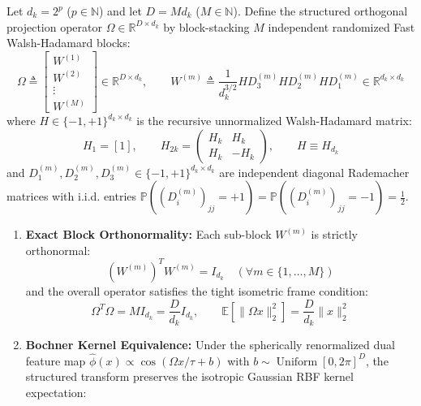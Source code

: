 
\begin{theorem}
\label{thm:fwht}
Let $d_k = 2^p$ ($p \in \mathbb{N}$) and let $D = M d_k$ ($M \in \mathbb{N}$). Define the structured orthogonal projection operator $\Omega \in \mathbb{R}^{D \times d_k}$ by block-stacking $M$ independent randomized Fast Walsh-Hadamard blocks:
\begin{equation}
\Omega \triangleq \begin{bmatrix} W^{(1)} \\ W^{(2)} \\ \vdots \\ W^{(M)} \end{bmatrix} \in \mathbb{R}^{D \times d_k}, \qquad W^{(m)} \triangleq \frac{1}{d_k^{3/2}} H D_3^{(m)} H D_2^{(m)} H D_1^{(m)} \in \mathbb{R}^{d_k \times d_k}
\label{eq:omega_fwht_def}
\end{equation}
where $H \in \{-1, +1\}^{d_k \times d_k}$ is the recursive unnormalized Walsh-Hadamard matrix:
\begin{equation}
H_1 = [1], \qquad H_{2k} = \begin{pmatrix} H_k & H_k \\ H_k & -H_k \end{pmatrix}, \qquad H \equiv H_{d_k}
\label{eq:hadamard_def}
\end{equation}
and $D_1^{(m)}, D_2^{(m)}, D_3^{(m)} \in \{-1, +1\}^{d_k \times d_k}$ are independent diagonal Rademacher matrices with i.i.d. entries $\mathbb{P}((D_i^{(m)})_{jj} = +1) = \mathbb{P}((D_i^{(m)})_{jj} = -1) = \frac{1}{2}$.
\begin{enumerate}[label=(\roman*)]
    \item \textbf{Exact Block Orthonormality:} Each sub-block $W^{(m)}$ is strictly orthonormal:
    \begin{equation}
    (W^{(m)})^T W^{(m)} = I_{d_k} \quad (\forall m \in \{1, \dots, M\})
    \label{eq:orthonormality}
    \end{equation}
    and the overall operator satisfies the tight isometric frame condition:
    \begin{equation}
    \Omega^T \Omega = M I_{d_k} = \frac{D}{d_k} I_{d_k}, \qquad \mathbb{E}\left[ \|\Omega x\|_2^2 \right] = \frac{D}{d_k} \|x\|_2^2
    \label{eq:frame_condition}
    \end{equation}
    \item \textbf{Bochner Kernel Equivalence:} Under the spherically renormalized dual feature map $\hat{\phi}(x) \propto \cos(\Omega x / \tau + b)$ with $b \sim \operatorname{Uniform}[0, 2\pi]^D$, the structured transform preserves the isotropic Gaussian RBF kernel expectation:

\end{enumerate}
\end{theorem}

